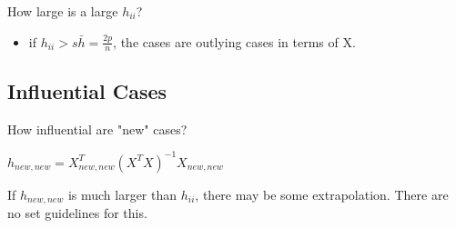 \documentclass[11pt]{article}
\begin{document}
How large is a large \(h_{ii}\)?
\begin{itemize}
\item if \(h_{ii} > s\bar{h} = \frac{2p}{n}\), the cases are outlying cases in terms
of X.
\end{itemize}

\subsection{Influential Cases}
\label{sec:orgef76a08}

How influential are "new" cases?

\(h_{new,new} = X_{new,new}^T (X^T X)^{-1} X_{new,new}\)

If \(h_{new,new}\) is much larger than \(h_{ii}\), there may be some extrapolation.
There are no set guidelines for this.
\end{document}
